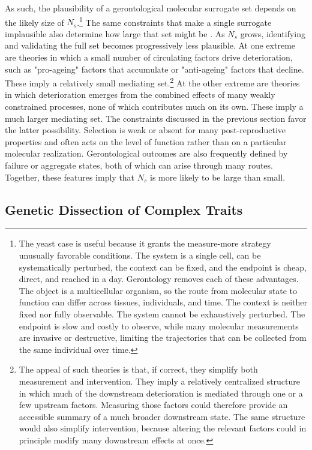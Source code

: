 \documentclass[twocolumn]{article} %
\begin{document}
As such, the plausibility of a gerontological molecular surrogate set depends on the likely size of $N_s$.\footnote{The yeast case is useful because it grants the measure-more strategy unusually favorable conditions. The system is a single cell, can be systematically perturbed, the context can be fixed, and the endpoint is cheap, direct, and reached in a day. Gerontology removes each of these advantages. The object is a multicellular organism, so the route from molecular state to function can differ across tissues, individuals, and time. The context is neither fixed nor fully observable. The system cannot be exhaustively perturbed. The endpoint is slow and costly to observe, while many molecular measurements are invasive or destructive, limiting the trajectories that can be collected from the same individual over time.} The same constraints that make a single surrogate implausible also determine how large that set might be \citep[d]{rolland2023challenges}. As $N_s$ grows, identifying and validating the full set becomes progressively less plausible. At one extreme are theories in which a small number of circulating factors drive deterioration, such as "pro-ageing" factors that accumulate or "anti-ageing" factors that decline. These imply a relatively small mediating set.\footnote{The appeal of such theories is that, if correct, they simplify both measurement and intervention. They imply a relatively centralized structure in which much of the downstream deterioration is mediated through one or a few upstream factors. Measuring those factors could therefore provide an accessible summary of a much broader downstream state. The same structure would also simplify intervention, because altering the relevant factors could in principle modify many downstream effects at once.} At the other extreme are theories in which deterioration emerges from the combined effects of many weakly constrained processes, none of which contributes much on its own. These imply a much larger mediating set. The constraints discussed in the previous section favor the latter possibility. Selection is weak or absent for many post-reproductive properties and often acts on the level of function rather than on a particular molecular realization. Gerontological outcomes are also frequently defined by failure or aggregate states, both of which can arise through many routes. Together, these features imply that $N_s$ is more likely to be large than small.

\subsection{Genetic Dissection of Complex Traits}
\end{document}
